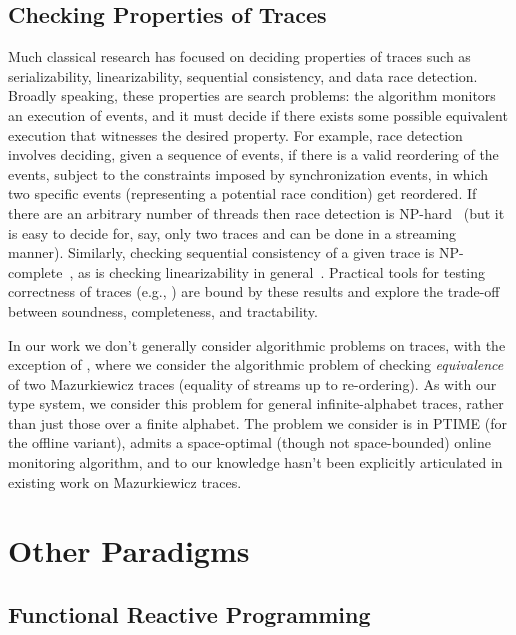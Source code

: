 \subsection{Checking Properties of Traces}

Much classical research has focused on deciding properties of traces such as serializability, linearizability, sequential consistency, and data race detection.
Broadly speaking, these properties are search problems: the algorithm monitors an execution of events, and it must decide if there exists some possible equivalent execution that witnesses the desired property. For example, race detection involves deciding, given a sequence of events, if there is a valid reordering of the events, subject to the constraints imposed by synchronization events, in which two specific events (representing a potential race condition) get reordered. If there are an arbitrary number of threads then race detection is NP-hard~\cite{netzer1990complexity,netzer1992race}
(but it is easy to decide for, say, only two traces and can be done in a streaming manner).
Similarly, checking sequential consistency of a given trace is NP-complete~\cite{gibbons1992complexity},
as is checking linearizability in general~\cite{gibbons1997testing}.
Practical tools for testing correctness of traces (e.g., \cite{savage1997eraser,park2011efficient,sen2008race,wing1993testing,burckhardt2010line,lowe2017testing}) are bound by these results and explore the trade-off between soundness, completeness, and tractability.

In our work we don't generally consider algorithmic problems on traces, with the exception of ,
where we consider the algorithmic problem of checking \emph{equivalence} of two Mazurkiewicz traces (equality of streams up to re-ordering).
As with our type system, we consider this problem for general infinite-alphabet traces, rather than just those over a finite alphabet.
The problem we consider is in PTIME (for the offline variant), admits a space-optimal (though not space-bounded) online monitoring algorithm,
and to our knowledge hasn't been explicitly articulated in existing work on Mazurkiewicz traces.

\section{Other Paradigms}

\subsection{Functional Reactive Programming}

